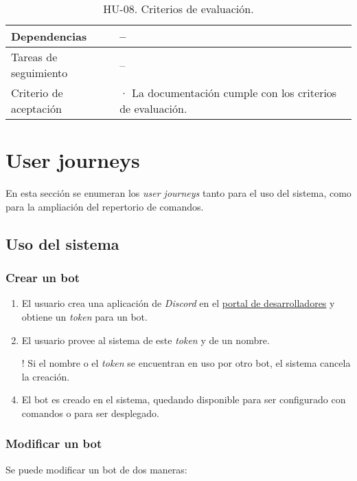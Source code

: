 \begin{table}[H]
\begin{adjustbox}{max width=\textwidth}
\begin{tabularx}{\textwidth}{|l|L|}
        Dependencias & – \\ \hline
        Tareas de seguimiento & – \\ \hline
        Criterio de aceptación & · La documentación cumple con los criterios de evaluación. \\ \hline
    \end{tabularx}
    \end{adjustbox}
    \caption{HU-08. Criterios de evaluación.}
\end{table}
  
\section{User journeys}

En esta sección se enumeran los \textit{user journeys} tanto para el uso del sistema, como para la ampliación del repertorio de comandos.

\subsection{Uso del sistema}

\subsubsection{Crear un bot}

\begin{enumerate}
	\item El usuario crea una aplicación de \textit{Discord} en el \href{https://discord.com/developers/applications}{portal de desarrolladores} y obtiene un \textit{token} para un bot.
	\item El usuario provee al sistema de este \textit{token} y de un nombre.
	\item[!] Si el nombre o el \textit{token} se encuentran en uso por otro bot, el sistema cancela la creación.
	\item El bot es creado en el sistema, quedando disponible para ser configurado con comandos o para ser desplegado.
\end{enumerate}

\subsubsection{Modificar un bot}

Se puede modificar un bot de dos maneras:

